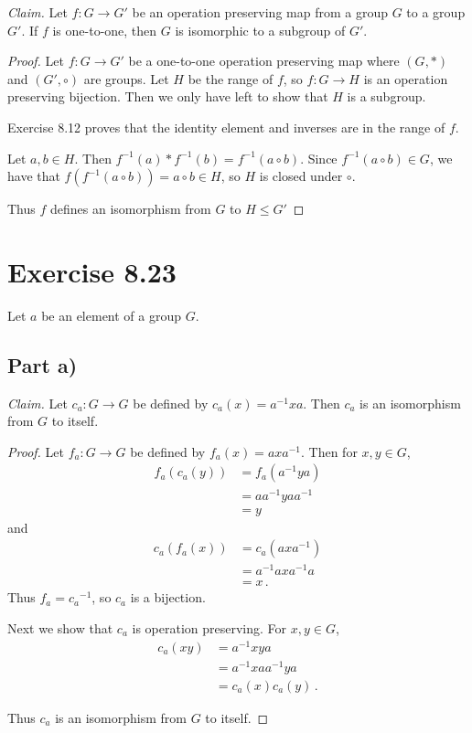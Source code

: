 \documentclass{abrice}
\newcommand{\Claim}{\emph{Claim.}\xspace}%
\begin{document}
\Claim Let $f : G \to G'$ be an operation preserving map from a group $G$ to a
group $G'$. If $f$ is one-to-one, then $G$ is isomorphic to a subgroup of
$G'$.

\begin{proof}
  Let $f : G \to G'$ be a one-to-one operation preserving map where $(G,*)$ and
  $(G', \circ)$ are groups. Let $H$ be the range of $f$, so $f : G \to H$ is an
  operation preserving bijection. Then we only have left to show that $H$ is a
  subgroup.

  Exercise 8.12 proves that the identity element and inverses are in the range
  of $f$.

  Let $a,b \in H$. Then $f^{-1}(a) * f^{-1}(b) = f^{-1}(a \circ b)$. Since
  $f^{-1}(a \circ b) \in G$, we have that $f(f^{-1}(a \circ b)) = a \circ b \in
  H$, so $H$ is closed under $\circ$.

  Thus $f$ defines an isomorphism from $G$ to $H \leq G'$
\end{proof}

\section{Exercise 8.23}

Let $a$ be an element of a group $G$.

\subsection{Part a)}

\Claim Let $c_a : G \to G$ be defined by $c_a(x) = a^{-1} x a$. Then $c_a$ is an
isomorphism from $G$ to itself.

\begin{proof}
  Let $f_a : G \to G$ be defined by $f_a(x) = a x a^{-1}$. Then for $x,y \in G$,
  \begin{align*}
    f_a(c_a(y))
    &= f_a(a^{-1} y a) \\
    &= a a^{-1} y a a^{-1} \\
    &= y
  \end{align*}
  and
  \begin{align*}
    c_a(f_a(x))
    &= c_a(a x a^{-1}) \\
    &= a^{-1} a x a^{-1} a \\
    &= x\, .
  \end{align*}
  Thus $f_a = {c_a}^{-1}$, so $c_a$ is a bijection.

  Next we show that $c_a$ is operation preserving. For $x,y \in G$,
  \begin{align*}
    c_a(xy)
    &= a^{-1} x y a \\
    &= a^{-1} x a a^{-1} y a \\
    &= c_a(x) c_a(y)\, .
  \end{align*}

  Thus $c_a$ is an isomorphism from $G$ to itself.
\end{proof}
\end{document}
